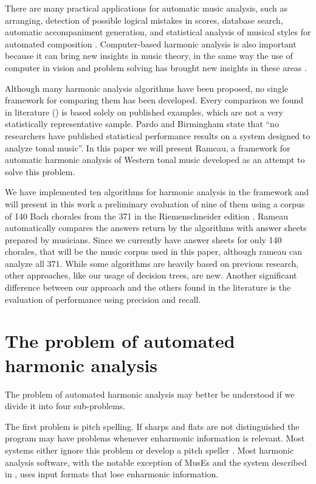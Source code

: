 \documentclass{article}
\begin{document}
There are many practical applications for automatic music analysis,
such as arranging, detection of possible logical mistakes in scores,
database search, automatic accompaniment generation, and statistical
analysis of musical styles for automated composition
\cite{pardo.ea:algorithms,temperley.ea:modeling}. Computer-based
harmonic analysis is also important because it can bring new insights
in music theory, in the same way the use of computer in vision and
problem solving has brought new insights in these areas
\cite{temperley.ea:modeling}.

Although many harmonic analysis algorithms have been proposed, no
single framework for comparing them has been developed. Every
comparison we found in literature (\cite{pardo.ea:automated,
  barthelemy.ea:figured, tsui:harmonic, taube:automatic,
  illescas.ea:harmonic}) is based solely on published examples, which
are not a very statistically representative sample. Pardo and
Birmingham \cite{pardo.ea:automated} state that ``no researchers have
published statistical performance results on a system designed to
analyze tonal music''. In this paper we will present Rameau, a
framework for automatic harmonic analysis of Western tonal music
developed as an attempt to solve this problem.

We have implemented ten algorithms for harmonic analysis in the
framework and will present in this work a preliminary evaluation of
nine of them using a corpus of 140 Bach chorales from the 371 in the
Riemenschneider edition \cite{bach:371}. Rameau automatically compares
the answers return by the algorithms with answer sheets prepared by
musicians. Since we currently have answer sheets for only 140
chorales, that will be the music corpus used in this paper, although
rameau can analyze all 371. While some algorithms are heavily based on
previous research, other approaches, like our usage of decision trees,
are new. Another significant difference between our approach and the
others found in the literature is the evaluation of performance using
precision and recall.

\section{The problem of automated harmonic analysis}
\label{sec:problem}

The problem of automated harmonic analysis may better be understood if
we divide it into four sub-problems.

The first problem is pitch spelling. If sharps and flats are not
distinguished the program may have problems whenever enharmonic
information is relevant. Most systems either ignore this problem or
develop a pitch speller \cite{temperley.ea:modeling}. Most harmonic
analysis software, with the notable exception of MusEs
\cite{pachet.ea:representing} and the system described in
\cite{illescas.ea:harmonic}, uses input formats that lose enharmonic
information.
\end{document}
